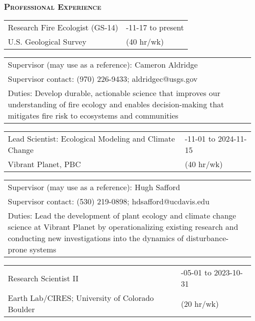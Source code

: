 \documentclass[10pt,english]{article}
\providecommand{\tabularnewline}{\\}
\begin{document}

\subsubsection*{\textsc{Professional Experience}}
\vspace{-0.5ex}

\linespread{1.1}

\renewcommand{\arraystretch}{1.2}
\begin{tabularx}{\textwidth}{@{}>{\raggedright}p{4.5in} >{\raggedleft}X@{}}
Research Fire Ecologist (GS-14) & 2024-11-17 to present \tabularnewline
U.S. Geological Survey & (40 hr/wk) \tabularnewline
\end{tabularx}

\renewcommand{\arraystretch}{1.2}
\begin{tabularx}{\textwidth}{@{}>{\raggedright}p{6.25in} >{\raggedleft}X@{}}
\addtolength{\leftskip}{5ex}Supervisor (may use as a reference): Cameron Aldridge \tabularnewline
\addtolength{\leftskip}{5ex}Supervisor contact: (970) 226-9433; aldridgec@usgs.gov \tabularnewline
\addtolength{\leftskip}{5ex}Duties: Develop durable, actionable science that improves our understanding of fire ecology and enables decision-making that mitigates fire risk to ecosystems and communities \tabularnewline
\end{tabularx}

\renewcommand{\arraystretch}{1.2}
\begin{tabularx}{\textwidth}{@{}>{\raggedright}p{4.5in} >{\raggedleft}X@{}}
Lead Scientist: Ecological Modeling and Climate Change & 2023-11-01 to 2024-11-15 \tabularnewline
Vibrant Planet, PBC & (40 hr/wk) \tabularnewline
\end{tabularx}

\renewcommand{\arraystretch}{1.2}
\begin{tabularx}{\textwidth}{@{}>{\raggedright}p{6.25in} >{\raggedleft}X@{}}
\addtolength{\leftskip}{5ex}Supervisor (may use as a reference): Hugh Safford \tabularnewline
\addtolength{\leftskip}{5ex}Supervisor contact: (530) 219-0898; hdsafford@ucdavis.edu \tabularnewline
\addtolength{\leftskip}{5ex}Duties: Lead the development of plant ecology and climate change science at Vibrant Planet by operationalizing existing research and conducting new investigations into the dynamics of disturbance-prone systems \tabularnewline
\end{tabularx}

\renewcommand{\arraystretch}{1.2}
\begin{tabularx}{\textwidth}{@{}>{\raggedright}p{4.5in} >{\raggedleft}X@{}}
Research Scientist II & 2023-05-01 to 2023-10-31 \tabularnewline
Earth Lab/CIRES; University of Colorado Boulder & (20 hr/wk) \tabularnewline
\end{tabularx}
\end{document}
